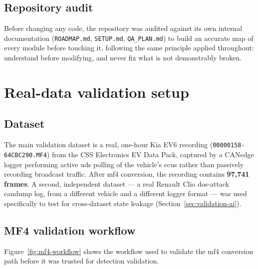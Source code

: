\subsection{Repository audit}

Before changing any code, the repository was audited against its own internal documentation (\texttt{ROADMAP.md}, \texttt{SETUP.md}, \texttt{QA\_PLAN.md}) to build an accurate map of every module before touching it, following the same principle applied throughout: understand before modifying, and never fix what is not demonstrably broken.

\section{Real-data validation setup}
\label{sec:validation-setup}

\subsection{Dataset}

The main validation dataset is a real, one-hour Kia EV6 recording (\texttt{00000158-64CBC290.MF4}) from the CSS Electronics EV Data Pack, captured by a CANedge logger performing active \gls{uds} polling of the vehicle's \gls{ecu}s rather than passively recording broadcast traffic. After \gls{mf4} conversion, the recording contains \textbf{97{,}741 frames}. A second, independent dataset — a real Renault Clio \gls{dos}-attack candump log, from a different vehicle and a different logger format — was used specifically to test for cross-dataset state leakage (Section~\ref{sec:validation-ai}).

\subsection{MF4 validation workflow}

Figure~\ref{fig:mf4-workflow} shows the workflow used to validate the \gls{mf4} conversion path before it was trusted for detection validation.

